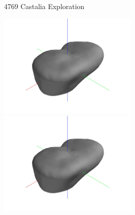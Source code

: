 \begin{frame}{4769 Castalia Exploration}

\begin{center}
    \href{https://youtu.be/EMlYvBGN8S0}{\includegraphics[trim={20cm 10cm 20cm 10cm},clip,keepaspectratio,width=0.5\textwidth,height=\textheight]{figures/dynamic_exploration/castalia/partial_14998.jpg}}%
        \href{https://youtu.be/jz-_SIi4a5A}{\includegraphics[trim={20cm 10cm 20cm 10cm},clip,keepaspectratio,width=0.5\textwidth,height=\textheight]{figures/dynamic_exploration/castalia/partial_14998.jpg}}
\end{center}

\end{frame}

